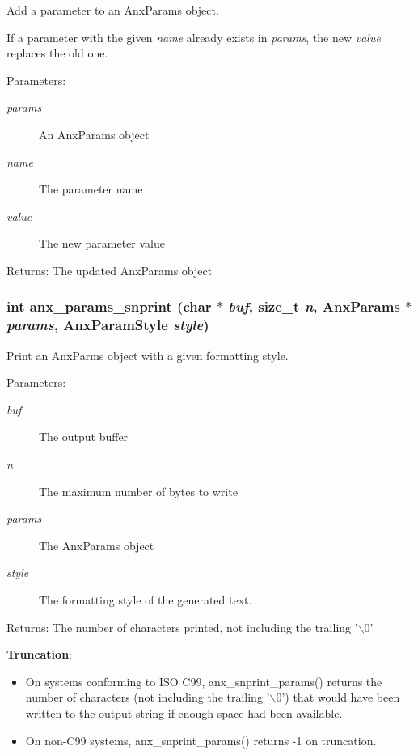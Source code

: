 Add a parameter to an Anx\-Params object. 

If a parameter with the given {\em name\/} already exists in {\em params\/}, the new {\em value\/} replaces the old one. \begin{Desc}
\item[Parameters:]
\begin{description}
\item[{\em params}]An Anx\-Params object \item[{\em name}]The parameter name \item[{\em value}]The new parameter value \end{description}
\end{Desc}
\begin{Desc}
\item[Returns:]The updated Anx\-Params object \end{Desc}
\subsubsection{\setlength{\rightskip}{0pt plus 5cm}int anx\_\-params\_\-snprint (char $\ast$ {\em buf}, size\_\-t {\em n}, {\bf Anx\-Params} $\ast$ {\em params}, {\bf Anx\-Param\-Style} {\em style})}\label{anx__params_8h_a6}


Print an Anx\-Parms object with a given formatting style. 

\begin{Desc}
\item[Parameters:]
\begin{description}
\item[{\em buf}]The output buffer \item[{\em n}]The maximum number of bytes to write \item[{\em params}]The Anx\-Params object \item[{\em style}]The formatting style of the generated text. \end{description}
\end{Desc}
\begin{Desc}
\item[Returns:]The number of characters printed, not including the trailing '$\backslash$0'\end{Desc}
{\bf Truncation}:\begin{itemize}
\item On systems conforming to ISO C99, anx\_\-snprint\_\-params() returns the number of characters (not including the trailing '$\backslash$0') that would have been written to the output string if enough space had been available.\item On non-C99 systems, anx\_\-snprint\_\-params() returns -1 on truncation. \end{itemize}
